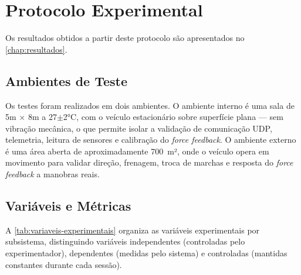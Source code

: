 \section{Protocolo Experimental}
\label{sec:protocolo-experimental}

Os resultados obtidos a partir deste protocolo são apresentados no \autoref{chap:resultados}.

\subsection{Ambientes de Teste}
\label{subsec:ambientes-teste}

Os testes foram realizados em dois ambientes. O ambiente interno é uma sala de 5m $\times$ 8m a 27$\pm$2°C, com o veículo estacionário sobre superfície plana --- sem vibração mecânica, o que permite isolar a validação de comunicação \gls{UDP}, telemetria, leitura de sensores e calibração do \textit{force feedback}. O ambiente externo é uma área aberta de aproximadamente 700~m², onde o veículo opera em movimento para validar direção, frenagem, troca de marchas e resposta do \textit{force feedback} a manobras reais.

\subsection{Variáveis e Métricas}
\label{subsec:variaveis-metricas}

A \autoref{tab:variaveis-experimentais} organiza as variáveis experimentais por subsistema, distinguindo variáveis independentes (controladas pelo experimentador), dependentes (medidas pelo sistema) e controladas (mantidas constantes durante cada sessão).

